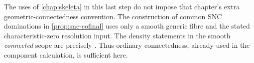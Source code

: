 The uses of \cref{chap:skeleta} in this last step do not impose that
chapter's extra geometric-connectedness convention.  The construction
of common SNC dominations in \cref{prop:snc-cofinal} uses only a
smooth generic fibre and the stated characteristic-zero resolution
input.  The density statements in the smooth \emph{connected} scope
are precisely \cite[\S2.4, Corollaries~2.4, 3.2 and 3.17]{BFJ16}.
Thus ordinary connectedness, already used in the component calculation,
is sufficient here.
